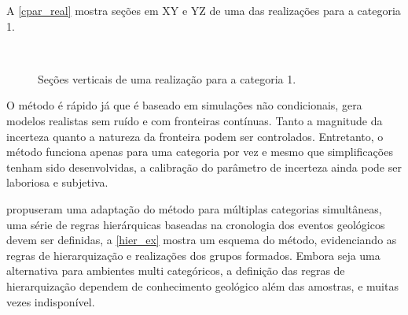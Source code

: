 A \autoref{cpar_real} mostra seções em XY e YZ de uma das realizações para a categoria 1.

\begin{figure}[H]
\caption{Seções verticais de uma realização para a categoria 1.} 
\label{cpar_real}
\begin{center}
\\
\end{center}
\begin{center}
\end{center}
\end{figure}

O método é rápido já que é baseado em simulações não condicionais, gera modelos realistas sem ruído e com fronteiras contínuas. Tanto a magnitude da incerteza quanto a natureza da fronteira podem ser controlados. Entretanto, o método funciona apenas para uma categoria por vez e mesmo que simplificações tenham sido desenvolvidas, a calibração do parâmetro de incerteza ainda pode ser laboriosa e subjetiva.

 propuseram uma adaptação  do método para múltiplas categorias simultâneas, uma série de regras hierárquicas baseadas na cronologia dos eventos geológicos devem ser definidas, a \autoref{hier_ex} mostra um esquema do método, evidenciando as regras de hierarquização e realizações dos grupos formados. Embora seja uma alternativa para ambientes multi categóricos, a definição das regras de hierarquização dependem de conhecimento geológico além das amostras, e muitas vezes indisponível.

